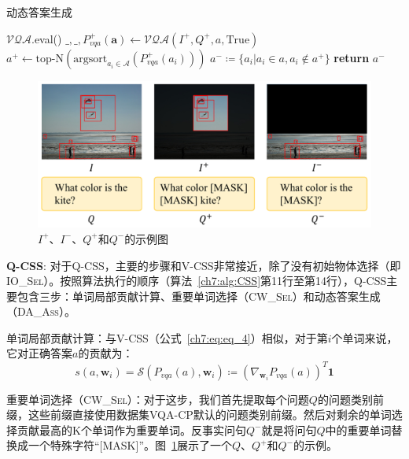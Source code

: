 \begin{algorithm}[tbp]
    \caption{动态答案生成}\label{ch7:alg:daass}
    \begin{algorithmic}[1]
        \State  $\mathcal{VQA}$.eval() 
        \State  $ \_, \_, P_{vqa}^+(\bm{a}) \leftarrow \mathcal{VQA}(I^+, Q^+, a, \text{True}) $
        \State $ a^+ \leftarrow \text{top-N}(\text{argsort}_{a_i \in \mathcal{A}}(P_{vqa}^+(a_i)))$
        \State $ a^- \coloneqq \{a_i | a_i \in a, a_i \notin a^+ \} $ 
        \State \textbf{return} $a^-$
        \EndFunction
    \end{algorithmic}
\end{algorithm}

\begin{figure}[t]
    \centering
        \includegraphics[width=0.8\linewidth]{chapter7/res/IQ+-.pdf}
    \caption{$I^+$、$I^-$、$Q^+$和$Q^-$的示例图}
    \label{ch7:fig:IQ+-}
\end{figure}

\textbf{Q-CSS}: 对于Q-CSS，主要的步骤和V-CSS非常接近，除了没有初始物体选择（即\textsc{IO\_Sel}）。按照算法执行的顺序（算法~\ref{ch7:alg:CSS}第11行至第14行），Q-CSS主要包含三步：单词局部贡献计算、重要单词选择（\textsc{CW\_Sel}）和动态答案生成（\textsc{DA\_Ass}）。

单词局部贡献计算：与V-CSS（公式~\eqref{ch7:eq:eq_4}）相似，对于第$i$个单词来说，它对正确答案$a$的贡献为：
\begin{equation} \label{ch7:eq:eq_6}
s(a, \bm{w}_i) = \mathcal{S}(P_{vqa}(a), \bm{w}_i) \coloneqq (\nabla_{\bm{w}_i} P_{vqa}(a))^T\mathbf{1}
\end{equation}

重要单词选择（\textsc{CW\_Sel}）：对于这步，我们首先提取每个问题$Q$的问题类别前缀，这些前缀直接使用数据集VQA-CP默认的问题类别前缀。然后对剩余的单词选择贡献最高的K个单词作为重要单词。反事实问句$Q^-$就是将问句$Q$中的重要单词替换成一个特殊字符“[MASK]”。图~\ref{ch7:fig:IQ+-}展示了一个$Q$、$Q^+$和$Q^-$的示例。

